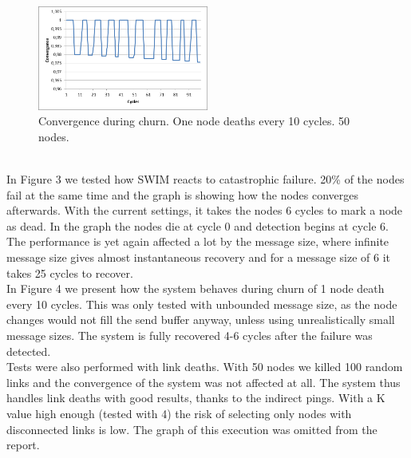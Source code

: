 \documentclass[10pt]{proc}
\begin{document}
\begin{figure}[h!]
\centering
\includegraphics[width=0.5\textwidth]{Fig4.png}
\caption{\label{fig.4}Convergence during churn. One node deaths every 10 cycles. 50 nodes.}
\end{figure}
\\[10pt]
In Figure 3 we tested how SWIM reacts to catastrophic failure. 20\% of the nodes fail at the same time and the graph is showing how the nodes converges afterwards. With the current settings, it takes the nodes 6 cycles to mark a node as dead. In the graph the nodes die at cycle 0 and detection begins at cycle 6. The performance is yet again affected a lot by the message size, where infinite message size gives almost instantaneous recovery and for a message size of 6 it takes 25 cycles to recover.
\\[10pt]
In Figure 4 we present how the system behaves during churn of 1 node death every 10 cycles. This was only tested with unbounded message size, as the node changes would not fill the send buffer anyway, unless using unrealistically small message sizes. The system is fully recovered  4-6 cycles after the failure was detected.
\\[10pt]
Tests were also performed with link deaths. With 50 nodes we killed 100 random links and the convergence of the system was not affected at all. The system thus handles link deaths with good results, thanks to the indirect pings. With a K value high enough (tested with 4) the risk of selecting only nodes with disconnected links is low. The graph of this execution was omitted from the report.
\end{document}
